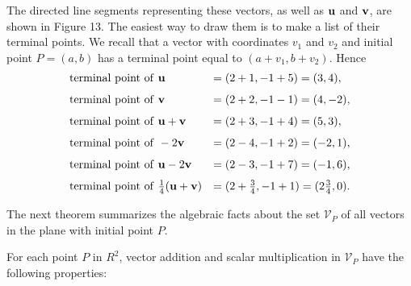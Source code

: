 \begin{example}
\noindent The directed line segments representing these vectors, as well as $\mbox{\bf{u}}$ and $\mbox{\bf{v}}$, are shown in Figure 13. The easiest way to draw them is to make a list of their terminal points. We recall that a vector with coordinates $v_1$ and $v_2$ and
initial point $P = (a, b)$ has a terminal point equal to $(a + v_1, b + v_2)$. Hence 
$$
\begin{array}{ll}
\mathrm{terminal~point~of~\bf{u}} &= (2 + 1, -1 + 5) = (3, 4),                   \vspace{.1in}\\
\mathrm{terminal~point~of~\bf{v}} &= (2 + 2, -1 - 1) = (4, -2),                  \vspace{.1in}\\
\mathrm{terminal~point~of~\bf{u}} + \mathrm{\bf{v}} &= (2 + 3, -1 + 4) = (5, 3),   \vspace{.1in}\\
\mathrm{terminal~point~of~ -2\bf{v}} &= (2 - 4, -1 + 2) = (-2, 1),               \vspace{.1in}\\
\mathrm{terminal~point~of~\bf{u}} - 2\mathrm{\bf{v}} &= (2 - 3, -1 + 7) = (-1, 6), \vspace{.1in}\\
\mathrm{terminal~point~of~} \frac{1}{4}(\mathrm{\bf{u} + \bf{v}}) &= (2 + \frac{3}{4}, -1 + 1) = (2\frac{3}{4}, 0).
\end{array}
$$
\end{example}

The next theorem summarizes the algebraic facts about the set $\mathcal{V}_P$ of all vectors in the plane with initial point $P$.

\begin{theorem} 
For each point $P$ in $R^2$, vector addition and scalar multiplication in $\mathcal{V}_P$ have the following properties:
\end{theorem}

